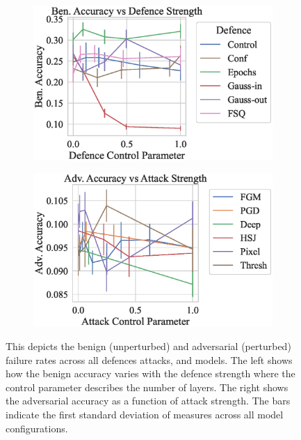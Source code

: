 \begin{figure}[!h]
    \centering
    \begin{subfigure}
        \centering
        \includegraphics[trim={0 10pt 0 10pt},clip,width=.4\textwidth]{cifar/def_param_vs_accuracy.eps}
    \end{subfigure}
    \begin{subfigure}
        \centering
        \includegraphics[trim={0 10pt 0 10pt},clip,width=.4\textwidth]{cifar/atk_param_vs_accuracy.eps}
    \end{subfigure}
    \caption{This depicts the benign (unperturbed) and adversarial (perturbed) failure rates across all defences attacks, and models. The left shows how the benign accuracy varies with the defence strength where the control parameter describes the number of layers. The right shows the adversarial accuracy as a function of attack strength. The bars indicate the first standard deviation of measures across all model configurations.}
    \label{fig:cifar_strength}
\end{figure}

